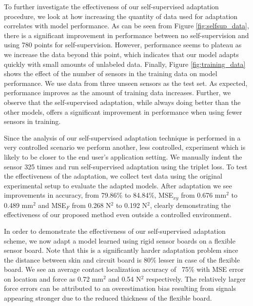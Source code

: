 \documentclass{article}
\begin{document}
To further investigate the effectiveness of our self-supervised adaptation procedure, we look at how increasing the quantity of data used for adaptation correlates with model performance. As can be seen from Figure \ref{fig:selfsup_data}, there is a significant improvement in performance between no self-supervision and using 780 points for self-supervision. However, performance seems to plateau as we increase the data beyond this point, which indicates that our model adapts quickly with small amounts of unlabeled data. Finally, Figure \ref{fig:training_data} shows the effect of the number of sensors in the training data on model performance. We use data from three unseen sensors as the test set. As expected, performance improves as the amount of training data increases. Further, we observe that the self-supervised adaptation, while always doing better than the other models, offers a significant improvement in performance when using fewer sensors in training.

Since the analysis of our self-supervised adaptation technique is performed in a very controlled scenario we perform another, less controlled, experiment which is likely to be closer to the end user's application setting. We manually indent the sensor 325 times and run self-supervised adaptation using the triplet loss. To test the effectiveness of the adaptation, we collect test data using the original experimental setup to evaluate the adapted models. After adaptation we see improvements in accuracy, from 79.86\% to 84.84\%, MSE$_{xy}$ from 0.676 mm$^2$ to 0.489 mm$^2$ and MSE$_{F}$ from 0.268 N$^2$ to 0.192 N$^2$, clearly demonstrating the effectiveness of our proposed method even outside a controlled environment.

In order to demonstrate the effectiveness of our self-supervised adaptation scheme, we now adapt a model learned using rigid sensor boards on a flexible sensor board. Note that this is a significantly harder adaptation problem since the distance between skin and circuit board is 80\% lesser in case of the flexible board. We see an average contact localization accuracy of ~75\% with MSE error on location and force as 0.72 mm$^2$ and 0.54 N$^2$ respectively. The relatively larger force errors can be attributed to an overestimation bias resulting from signals appearing stronger due to the reduced thickness of the flexible board.

\vspace{-0.1in}
\end{document}
